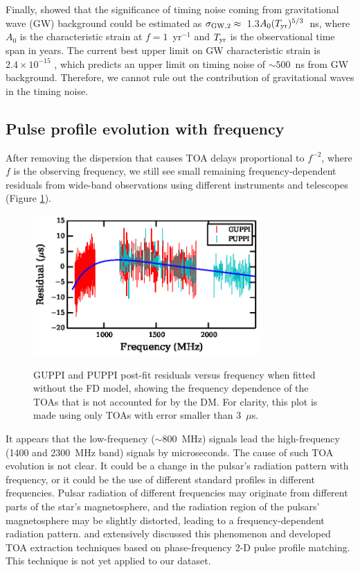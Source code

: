 Finally, \citet{sc10} showed that the significance of timing noise coming from
gravitational wave (GW) background could be estimated as
$\sigma_{\rm GW,2} \approx$~1.3$A_0(T_{\rm yr})^{5/3}$~ns, where $A_0$ is the
characteristic strain at $f=1$~yr$^{-1}$ and $T_{\rm yr}$ is the observational
time span in years. The current best upper limit on GW characteristic 
strain is $2.4\times10^{-15}$ \citep{src+13}, which predicts an upper limit on
timing noise of $\sim500$~ns from GW background. Therefore, we
cannot rule out the contribution of gravitational waves in the timing noise.


\subsection{Pulse profile evolution with frequency}
\label{sec:FD}
After removing the dispersion that causes TOA delays proportional to $f^{-2}$,
where $f$ is the observing frequency,
 we still see small remaining frequency-dependent residuals from wide-band
observations using
different instruments and telescopes (Figure \ref{fig:FD}). 
%
\begin{figure}
\includegraphics[width=3.4in]{FD.ps} \\ 
\caption {\label{fig:FD} GUPPI and PUPPI post-fit residuals versus frequency when fitted
without the FD model, showing the frequency dependence of the TOAs that is 
not accounted for by the DM. For
clarity, this plot is made using only TOAs with error smaller than 3~$\mu$s.} 
\end{figure} 
% 
It appears that the low-frequency ($\sim$800~MHz) signals lead the
high-frequency (1400 and 2300~MHz band) signals by microseconds.
The cause of such TOA evolution is not clear. It could be a change in the pulsar's
radiation pattern with frequency, or it could be the use of different
standard profiles in different frequencies. Pulsar radiation of different frequencies may originate from
different parts of the star's magnetosphere, and 
the radiation region of the pulsars' magnetosphere may be slightly distorted,
leading to a frequency-dependent radiation pattern. \citet{pdr14} and \citet{ldc+14} 
extensively discussed this phenomenon and developed TOA extraction techniques
based on phase-frequency 2-D pulse profile matching. This technique is not
yet applied to our dataset.


